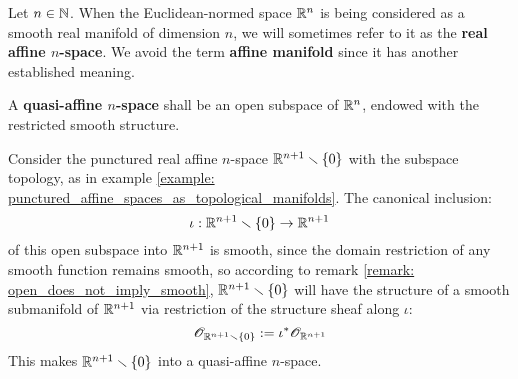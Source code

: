         \begin{convention} \label{conv: (quasi)_affine_spaces}
            Let $n \in \mathbb{N}$. When the Euclidean-normed space $\mathbb{R}^n$ is being considered as a smooth real manifold of dimension $n$, we will sometimes refer to it as the \textbf{real affine $n$-space}. We avoid the term \textbf{affine manifold} since it has another established meaning.

            A \textbf{quasi-affine $n$-space} shall be an open subspace of $\mathbb{R}^n$, endowed with the restricted smooth structure.
        \end{convention}

        \begin{example} \label{example: punctured_affine_spaces_as_smooth_manifolds}
            Consider the punctured real affine $n$-space $\mathbb{R}^{n + 1} \smallsetminus \{0\}$ with the subspace topology, as in example \ref{example: punctured_affine_spaces_as_topological_manifolds}. The canonical inclusion:
                $$\iota: \mathbb{R}^{n + 1} \smallsetminus \{0\} \to \mathbb{R}^{n + 1}$$
            of this open subspace into $\mathbb{R}^{n + 1}$ is smooth, since the domain restriction of any smooth function remains smooth, so according to remark \ref{remark: open_does_not_imply_smooth}, $\mathbb{R}^{n + 1} \smallsetminus \{0\}$ will have the structure of a smooth submanifold of $\mathbb{R}^{n + 1}$ via restriction of the structure sheaf along $\iota$:
                $$\mathscr{O}_{\mathbb{R}^{n + 1} \smallsetminus \{0\}} := \iota^* \mathscr{O}_{\mathbb{R}^{n + 1}}$$
            This makes $\mathbb{R}^{n + 1} \smallsetminus \{0\}$ into a quasi-affine $n$-space.
        \end{example}

